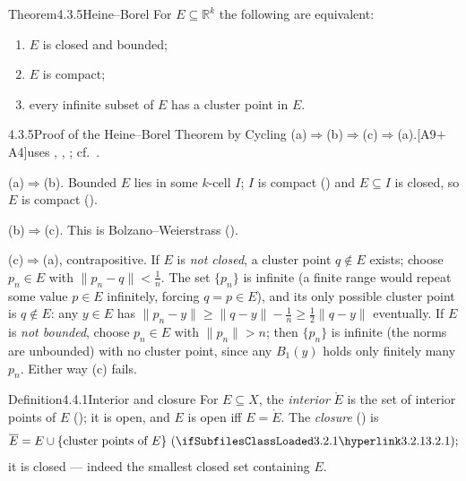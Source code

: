 \documentclass[main.tex]{subfiles}
\begin{document}
\begin{Obj}{Theorem}{4.3.5}{Heine--Borel}
For $E\subseteq\mathbb R^k$ the following are equivalent:
\begin{enumerate}
  \item $E$ is closed and bounded;
  \item $E$ is compact;
  \item every infinite subset of $E$ has a cluster point in $E$.
\end{enumerate}
\end{Obj}
\begin{Prf}{4.3.5}{Proof of the Heine--Borel Theorem by Cycling (a)$\Rightarrow$(b)$\Rightarrow$(c)$\Rightarrow$(a).}{[A9$+$A4]\quad uses , , ; cf.\ .}
\item \textnormal{(a)$\Rightarrow$(b).} Bounded $E$ lies in some $k$-cell $I$; $I$ is compact
  () and $E\subseteq I$ is closed, so $E$ is compact ().
\item \textnormal{(b)$\Rightarrow$(c).} This is Bolzano--Weierstrass ().
\item \textnormal{(c)$\Rightarrow$(a), contrapositive.} If $E$ is \emph{not closed}, a cluster point
  $q\notin E$ exists; choose $p_n\in E$ with $\|p_n-q\|<\tfrac1n$. The set $\{p_n\}$ is infinite (a
  finite range would repeat some value $p\in E$ infinitely, forcing $q=p\in E$), and its only
  possible cluster point is $q\notin E$: any $y\in E$ has $\|p_n-y\|\ge\|q-y\|-\tfrac1n\ge\tfrac12
  \|q-y\|$ eventually. If $E$ is \emph{not bounded}, choose $p_n\in E$ with $\|p_n\|>n$; then
  $\{p_n\}$ is infinite (the norms are unbounded) with no cluster point, since any $B_1(y)$ holds
  only finitely many $p_n$. Either way (c) fails.
\end{Prf}


\begin{Obj}{Definition}{4.4.1}{Interior and closure}
For $E\subseteq X$, the \emph{interior} $\mathring E$ is the set of interior points of $E$
(); it is open, and $E$ is open iff $E=\mathring E$. The \emph{closure} () is
\[ \overline E=E\cup\{\text{cluster points of }E\}\ (\xrefL{3.2.1}); \]
it is closed --- indeed the smallest closed set containing $E$.
\end{Obj}
\end{document}
